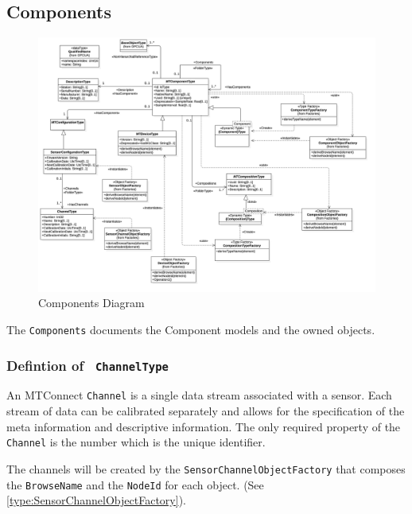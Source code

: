 \subsection{Components} \label{model:Components}

\begin{figure}[ht]
  \centering
    \includegraphics[width=1.0\textwidth]{./diagrams/Components.png}
  \caption{Components Diagram}
  \label{fig:Components}
\end{figure}

\FloatBarrier


The \texttt{Components} documents the Component models and the owned objects.

\subsubsection{Defintion of \texttt{ ChannelType}} \label{type:ChannelType}

\FloatBarrier

An MTConnect \texttt{Channel} is a single data stream associated with a sensor. Each stream
of data can be calibrated separately and allows for the specification of the meta information
and descriptive information. The only required property of the \texttt{Channel} is the number
which is the unique identifier.

The channels will be created by the \texttt{SensorChannelObjectFactory} that composes the \texttt{BrowseName} 
and the \texttt{NodeId} for each object. (See \ref{type:SensorChannelObjectFactory}).

